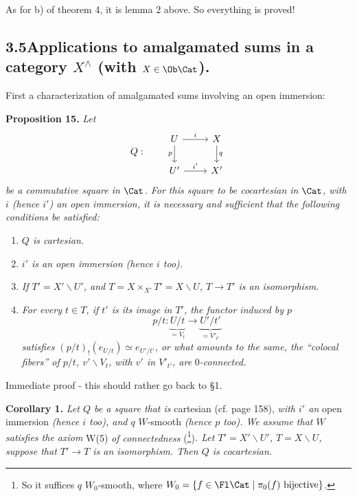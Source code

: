  As for b) of theorem 4, it is lemma 2 above. So everything is proved!


\subsection*{3.5\quad Applications to amalgamated sums in a category $X^{\wedge}$ (with $X \in \Ob \Cat$).}

First a characterization of amalgamated sums involving an open immersion:

\textbf{Proposition 15.} \textit{Let}
\[
Q : \qquad
\begin{tikzcd}
U \ar[r, "i"] \ar[d, "p"'] & X \ar[d, "q"] \\
U' \ar[r, "i'"] & X'
\end{tikzcd}
\]
\textit{be a commutative square in} $\Cat$\textit{. For this square to be cocartesian in} $\Cat$\textit{, with $i$ (hence $i'$) an open immersion, it is necessary and sufficient that the following conditions be satisfied:}

\begin{enumerate}[label={}, leftmargin=2.5em]
\item[\textit{a)}] \textit{$Q$ is cartesian.}
\item[\textit{b)}] \textit{$i'$ is an open immersion (hence $i$ too).}
\item[\textit{c)}] \textit{If $T' = X' \backslash U'$, and $T = X \times_{X'} T' = X \backslash U$, $T \longrightarrow T'$ is an isomorphism.}
\item[\textit{d)}] \textit{For every $t \in T$, if $t'$ is its image in $T'$, the functor induced by $p$}
\[
p/t : \underbrace{U/t}_{= V_t} \longrightarrow \underbrace{U'/t'}_{= V'_{t'}}
\]
\textit{satisfies $(p/t)_!(e_{U/t}) \simeq e_{U'/t'}$, or what amounts to the same, the ``colocal fibers'' of $p/t$, $v' \backslash V_t$, with $v'$ in $V'_{t'}$, are} $0$\textit{-connected.}
\end{enumerate}

Immediate proof - this should rather go back to §1.

\textbf{Corollary 1.} \textit{Let $Q$ be a square that is} cartesian (cf. page 158), \textit{with $i'$ an} open immersion \textit{(hence $i$ too), and $q$} $W$-smooth \textit{(hence $p$ too). We assume that $W$ satisfies the axiom} W(5) \textit{of connectedness} (\footnote[109]{So it suffices $q$ $W_0$-smooth, where $W_0 = \{f \in \Fl \Cat \mid \pi_0(f) \text{ bijective}\}$.})\textit{. Let $T' = X' \backslash U'$, $T = X \backslash U$, suppose that $T' \longrightarrow T$ is an isomorphism. Then $Q$ is cocartesian.}

